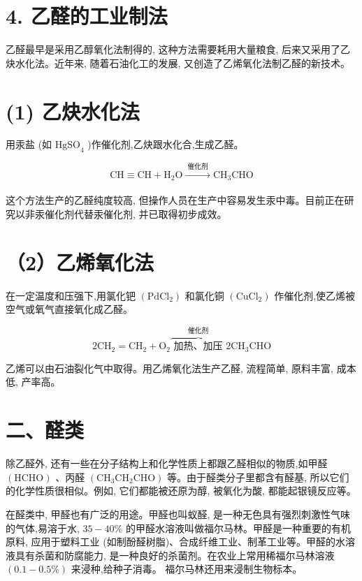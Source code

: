 \documentclass[10pt]{article}
\begin{document}
\section*{4. 乙醛的工业制法}

乙醛最早是采用乙醇氧化法制得的, 这种方法需要耗用大量粮食, 后来又采用了乙炔水化法。近年来, 随着石油化工的发展, 又创造了乙烯氧化法制乙醛的新技术。

\section*{(1) 乙炔水化法}

用汞盐 (如 \({\mathrm{{HgSO}}}_{4}\) )作催化剂,乙炔跟水化合,生成乙醛。

\[
\mathrm{{CH}} \equiv \mathrm{{CH}} + {\mathrm{H}}_{2}\mathrm{O}\xrightarrow[]{\text{ 催化剂 }}{\mathrm{{CH}}}_{3}\mathrm{{CHO}}
\]

这个方法生产的乙醛纯度较高, 但操作人员在生产中容易发生汞中毒。目前正在研究以非汞催化剂代替汞催化剂, 并已取得初步成效。

\section*{（2）乙烯氧化法}

在一定温度和压强下,用氯化钯 \(\left( {\mathrm{{PdCl}}}_{2}\right)\) 和氯化铜 \(\left( {\mathrm{{CuCl}}}_{2}\right)\) 作催化剂,使乙烯被空气或氧气直接氧化成乙醛。

\[
2{\mathrm{{CH}}}_{2} = {\mathrm{{CH}}}_{2} + {\mathrm{O}}_{2}\overset{\text{ 催化剂 }}{\overbrace{\text{ 加热、加压 }}}2{\mathrm{{CH}}}_{3}\mathrm{{CHO}}
\]

乙烯可以由石油裂化气中取得。用乙烯氧化法生产乙醛, 流程简单, 原料丰富, 成本低, 产率高。

\section*{二、醛类}

除乙醛外, 还有一些在分子结构上和化学性质上都跟乙醛相似的物质,如甲醛 \(\left( \mathrm{{HCHO}}\right)\) 、丙醛 \(\left( {{\mathrm{{CH}}}_{3}{\mathrm{{CH}}}_{2}\mathrm{{CHO}}}\right)\) 等。由于醛类分子里都含有醛基, 所以它们的化学性质很相似。例如, 它们都能被还原为醇, 被氧化为酸, 都能起银镜反应等。

在醛类中, 甲醛也有广泛的用途。甲醛也叫蚁醛, 是一种无色具有强烈刺激性气味的气体,易溶于水, \({35} - {40}\%\) 的甲醛水溶液叫做福尔马林。甲醛是一种重要的有机原料, 应用于塑料工业 (如制酚醛树脂)、合成纤维工业、制革工业等。甲醛的水溶液具有杀菌和防腐能力, 是一种良好的杀菌剂。在农业上常用稀福尔马林溶液 \(\left( {{0.1} - {0.5}\% }\right)\) 来浸种,给种子消毒。 福尔马林还用来浸制生物标本。
\end{document}
